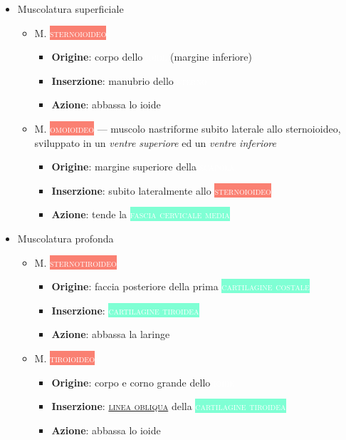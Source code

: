 \documentclass[italian,]{article}
\providecommand{\tightlist}{%
  \setlength{\itemsep}{0pt}\setlength{\parskip}{0pt}}
\newcommand{\mus}[1]{\colorbox{Salmon}{\textcolor{white}{\textsc{#1}}}}
\newcommand{\oss}[1]{\colorbox{ossa}{\textcolor{white}{\textsc{#1}}}}
\newcommand{\tol}[1]{\colorbox{Aquamarine}{\textcolor{white}{\textsc{#1}}}}
\renewcommand{\a}[1]{\underline{\textsc{#1}}}
\begin{document}
\begin{itemize}
\tightlist
\item
  Muscolatura superficiale

  \begin{itemize}
  \tightlist
  \item
    M. \mus{sternoioideo}~

    \begin{itemize}
    \tightlist
    \item
      \textbf{Origine}: corpo dello \oss{ioide} (margine inferiore)
    \item
      \textbf{Inserzione}: manubrio dello \oss{sterno}
    \item
      \textbf{Azione}: abbassa lo ioide
    \end{itemize}
  \item
    M. \mus{omoioideo} --- muscolo nastriforme subito laterale allo
    sternoioideo, sviluppato in un \emph{ventre superiore} ed un
    \emph{ventre inferiore}

    \begin{itemize}
    \tightlist
    \item
      \textbf{Origine}: margine superiore della \oss{scapola}
    \item
      \textbf{Inserzione}: subito lateralmente allo \mus{sternoioideo}
    \item
      \textbf{Azione}: tende la \tol{fascia cervicale media}
    \end{itemize}
  \end{itemize}
\item
  Muscolatura profonda

  \begin{itemize}
  \tightlist
  \item
    M. \mus{sternotiroideo}~

    \begin{itemize}
    \tightlist
    \item
      \textbf{Origine}: faccia posteriore della prima
      \tol{cartilagine costale}
    \item
      \textbf{Inserzione}: \tol{cartilagine tiroidea}
    \item
      \textbf{Azione}: abbassa la laringe
    \end{itemize}
  \item
    M. \mus{tiroioideo}~

    \begin{itemize}
    \tightlist
    \item
      \textbf{Origine}: corpo e corno grande dello \oss{ioide}
    \item
      \textbf{Inserzione}: \a{linea obliqua} della
      \tol{cartilagine tiroidea}
    \item
      \textbf{Azione}: abbassa lo ioide
    \end{itemize}
  \end{itemize}
\end{itemize}
\end{document}
